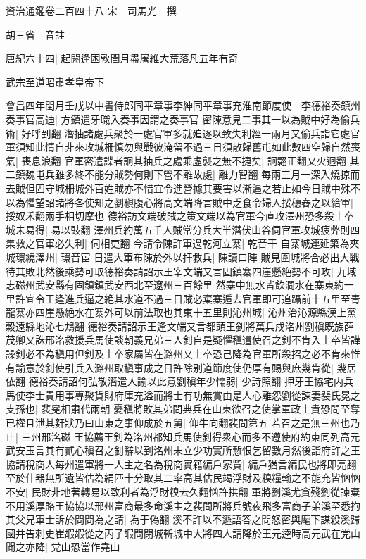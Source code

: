 資治通鑑卷二百四十八
宋　司馬光　撰

胡三省　音註

唐紀六十四|{
	起閼逢困敦閏月盡屠維大荒落凡五年有奇}


武宗至道昭肅孝皇帝下

會昌四年閏月壬戌以中書侍郎同平章事李紳同平章事充淮南節度使　李德裕奏鎮州奏事官高迪|{
	方鎮遣牙職入奏事因謂之奏事官}
密陳意見二事其一以為賊中好為偷兵術|{
	好呼到翻}
潛抽諸處兵聚於一處官軍多就廹逐以致失利經一兩月又偷兵詣它處官軍須知此情自非來攻城柵慎勿與戰彼淹留不過三日須散歸舊屯如此數四空歸自然喪氣|{
	喪息浪翻}
官軍密遣諜者詗其抽兵之處乘虛襲之無不捷矣|{
	詗翾正翻又火迥翻}
其二鎮魏屯兵雖多終不能分賊勢何則下營不離故處|{
	離力智翻}
每兩三月一深入燒掠而去賊但固守城柵城外百姓賊亦不惜宜令進營據其要害以漸逼之若止如今日賊中殊不以為懼望詔諸將各使知之劉稹腹心將高文端降言賊中乏食令婦人挼穗舂之以給軍|{
	挼奴禾翻兩手相切摩也}
德裕訪文端破賊之策文端以為官軍今直攻澤州恐多殺士卒城未易得|{
	易以豉翻}
澤州兵約萬五千人賊常分兵大半潛伏山谷伺官軍攻城疲弊則四集救之官軍必失利|{
	伺相吏翻}
今請令陳許軍過乾河立寨|{
	乾音干}
自寨城連延築為夾城環繞澤州|{
	環音宦}
日遣大軍布陳於外以扞救兵|{
	陳讀曰陣}
賊見圍城將合必出大戰待其敗北然後乘勢可取德裕奏請詔示王宰文端又言固鎮寨四崖懸絶勢不可攻|{
	九域志磁州武安縣有固鎮鎮武安西北至遼州三百餘里}
然寨中無水皆飲澗水在寨東約一里許宜令王逢進兵逼之絶其水道不過三日賊必棄寨遁去官軍即可追躡前十五里至青龍寨亦四崖懸絶水在寨外可以前法取也其東十五里則沁州城|{
	沁州治沁源縣漢上黨穀遠縣地沁七鴆翻}
德裕奏請詔示王逢文端又言都頭王釗將萬兵戍洺州劉稹既族薛茂卿又誅邢洺救援兵馬使談朝義兄弟三人釗自是疑懼稹遣使召之釗不肯入士卒皆譁譟釗必不為稹用但釗及士卒家屬皆在潞州又士卒恐己降為官軍所殺招之必不肯來惟有諭意於釗使引兵入潞州取稹事成之日許除别道節度使仍厚有賜與庶幾肯從|{
	幾居依翻}
德裕奏請詔何弘敬潛遣人諭以此意劉稹年少懦弱|{
	少詩照翻}
押牙王協宅内兵馬使李士貴用事專聚貨財府庫充溢而將士有功無賞由是人心離怨劉從諫妻裴氏冕之支孫也|{
	裴冕相肅代兩朝}
憂稹將敗其弟問典兵在山東欲召之使掌軍政士貴恐問至奪已權且泄其姧狀乃曰山東之事仰成於五舅|{
	仰牛向翻裴問第五}
若召之是無三州也乃止|{
	三州邢洺磁}
王協薦王釗為洺州都知兵馬使釗得衆心而多不遵使府約束同列高元武安玉言其有貳心稹召之釗辭以到洺州未立少功實所慙恨乞留數月然後詣府許之王協請稅商人每州遣軍將一人主之名為稅商實籍編戶家貲|{
	編戶猶言編民也將即亮翻}
至於什器無所遺皆估為絹匹十分取其二率高其估民竭浮財及糗糧輸之不能充皆忷忷不安|{
	民財非地著轉易以致利者為浮財糗去久翻忷許拱翻}
軍將劉溪尤貪殘劉從諫棄不用溪厚賂王協協以邢州富商最多命溪主之裴問所將兵號夜飛多富商子弟溪至悉拘其父兄軍士訴於問問為之請|{
	為于偽翻}
溪不許以不遜語答之問怒密與麾下謀殺溪歸國并告刺史崔嘏嘏從之丙子嘏問閉城斬城中大將四人請降於王元逵時高元武在党山聞之亦降|{
	党山恐當作堯山}
